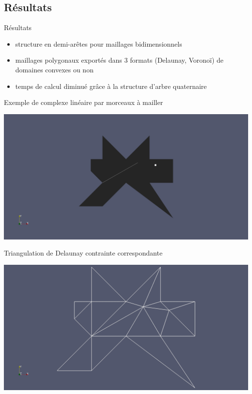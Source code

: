 \documentclass[aspectratio=169, 12pt, a4paper, hyperref={pdfauthor={Alexandre MARIN}, pdfkeywords={IFPEN, Delaunay, Voronoi, mesh generation}, colorlinks=true, linkcolor=purple, urlcolor=blue, citecolor=magenta}]{beamer}
\begin{document}
\subsection{Résultats}
\begin{Energie}{Résultats}
\begin{itemize}
\item structure en demi-arêtes pour maillages bidimensionnels
\item maillages polygonaux exportés dans $3$ formats (Delaunay, Voronoï) de domaines convexes ou non
\item temps de calcul diminué grâce à la structure d'arbre quaternaire
\end{itemize}
\end{Energie}

\begin{Energie}{\normalsize Exemple de complexe linéaire par morceaux à mailler}
\begin{center}
\includegraphics[scale=0.25, viewport=620 250 1550 950, clip]{odd_plc.jpg}
\end{center}
\end{Energie}

\begin{Energie}{\normalsize Triangulation de Delaunay contrainte correspondante}
\begin{center}
\includegraphics[scale=0.2, viewport=600 250 1750 1129, clip]{odd_cdt.jpg}
\end{center}
\end{Energie}
\end{document}
